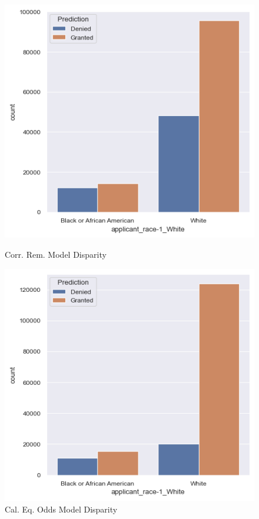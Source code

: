 \begin{figure}[h]
    \begin{minipage}{0.5\textwidth}
        \centering
        \includegraphics[width=\textwidth]{images/loan_grants_by_protected_attributes/correlation_removed.png}
        \caption{Corr. Rem. Model Disparity}
        \label{fig:Correlation_Removed_Disparity}
    \end{minipage}\hfill
    \begin{minipage}{0.5\textwidth}
        \centering
        \includegraphics[width=\textwidth]{images/loan_grants_by_protected_attributes/calibrated_eqodds.png} 
        \caption{Cal. Eq. Odds Model Disparity}
        \label{fig:Calibrated_EqOdds_Disparity}
    \end{minipage}
    

\end{figure}
